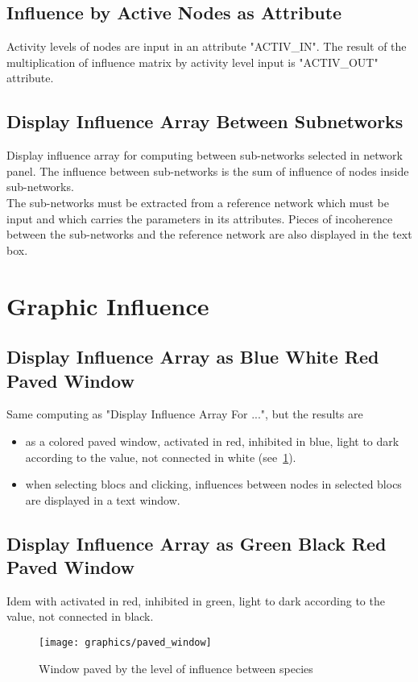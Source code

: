\documentclass[11pt]{article}
\begin{document}
\subsection{Influence by Active Nodes as Attribute}
Activity levels of nodes are input in an attribute "ACTIV\_IN". The result of the multiplication of influence matrix by activity level input is "ACTIV\_OUT" attribute.

\subsection{Display Influence Array Between Subnetworks}
Display influence array for computing between sub-networks selected in network panel. The influence between sub-networks is the sum of influence of nodes inside sub-networks.\\
The sub-networks must be extracted from a reference network which must be input and which carries the parameters in its attributes. Pieces of incoherence between the sub-networks and the reference network are also displayed in the text box.

\section{Graphic Influence}
\subsection{Display Influence Array as Blue White Red Paved Window}
Same computing as "Display Influence Array For ...", but the results are   
\begin{itemize}
\item as a colored paved window, activated in red, inhibited in blue, light to dark according to the value, not connected in white (see~\ref{paved_window}).
\item when selecting blocs and clicking, influences between nodes in selected blocs are displayed in a text window.
\end{itemize}

\subsection{Display Influence Array as Green Black Red Paved Window}
Idem with activated in red, inhibited in green, light to dark according to the value, not connected in black.

\begin{figure}
\centering
\texttt{[image: graphics/paved\_window]}
\caption{Window paved by the level of influence between species}
\label{paved_window}
\end{figure}
\end{document}

